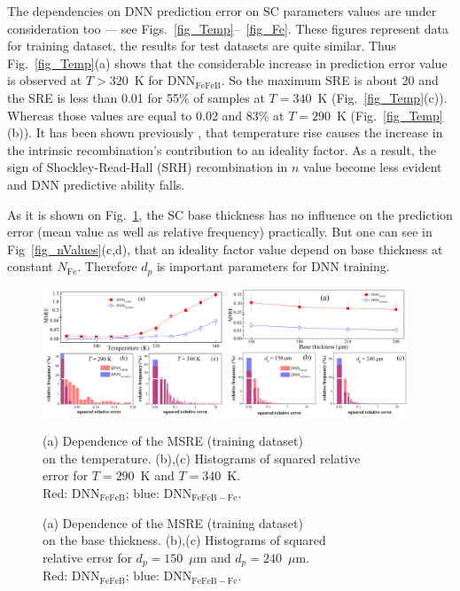 \documentclass[a4paper,fleqn]{cas-sc}
\begin{document}
The dependencies on DNN prediction error on SC parameters values are under consideration too ---
see Figs.~\ref{fig_Temp}--~\ref{fig_Fe}.
These figures represent data for training dataset, the results for test datasets are quite similar.
Thus Fig.~\ref{fig_Temp}(a) shows that the considerable increase in prediction error value is observed at $T>320$~K for DNN$_\mathrm{FeFeB}$.
So the maximum SRE is about 20 and the SRE is less than 0.01 for 55\% of samples at $T=340$~K
(Fig.~\ref{fig_Temp}(c)).
Whereas those values are equal to 0.02 and 83\% at $T=290$~K (Fig.~\ref{fig_Temp}(b)).
It has been shown previously \cite{OlikhJPS}, that temperature rise causes the increase in
the intrinsic recombination's contribution to an ideality factor.
As a result, the sign of Shockley-Read-Hall (SRH) recombination in $n$ value become less evident
and DNN predictive ability falls.


As it is shown on Fig.~\ref{fig_depth}, the SC base thickness has no influence on
the prediction error (mean value as well as relative frequency) practically.
But one can see in Fig~\ref{fig_nValues}(c,d), that an ideality factor value depend on
base thickness at constant $N_\mathrm{Fe}$.
Therefore $d_p$ is important parameters for DNN training.


\begin{figure}[tb]
\centering
\includegraphics[width=0.48\textwidth]{F4} \hfill
\includegraphics[width=0.48\textwidth]{F5} \\
\parbox[t]{0.48\textwidth}
{\caption{(a) Dependence of the MSRE (training dataset) \\on the temperature.
(b),(c) Histograms of squared relative \\error for $T=290$~K and $T=340$~K.\\
Red: DNN$_\mathrm{FeFeB}$; blue: DNN$_\mathrm{FeFeB-Fe}$.
}
\label{fig_Temp}} \hfill
\parbox[t]{0.48\textwidth}{\caption{(a) Dependence of the MSRE (training dataset) \\on the base thickness.
(b),(c) Histograms of squared \\ relative error for $d_p=150$~$\mu$m and $d_p=240$~$\mu$m.\\
Red: DNN$_\mathrm{FeFeB}$; blue: DNN$_\mathrm{FeFeB-Fe}$.}
\label{fig_depth}}
\end{figure}
\end{document}
